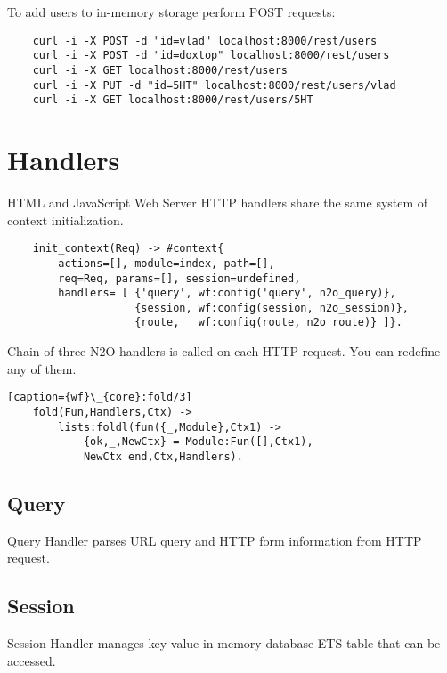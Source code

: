 To add users to in-memory storage perform POST requests:

\vspace{1\baselineskip}
\begin{lstlisting}
    curl -i -X POST -d "id=vlad" localhost:8000/rest/users
    curl -i -X POST -d "id=doxtop" localhost:8000/rest/users
    curl -i -X GET localhost:8000/rest/users
    curl -i -X PUT -d "id=5HT" localhost:8000/rest/users/vlad
    curl -i -X GET localhost:8000/rest/users/5HT
\end{lstlisting}
\vspace{1\baselineskip}

\section{Handlers}
HTML and JavaScript Web Server HTTP handlers share the same system
of context initialization. 

\vspace{1\baselineskip}
\begin{lstlisting}
    init_context(Req) -> #context{
        actions=[], module=index, path=[],
        req=Req, params=[], session=undefined,
        handlers= [ {'query', wf:config('query', n2o_query)},
                    {session, wf:config(session, n2o_session)},
                    {route,   wf:config(route, n2o_route)} ]}.
\end{lstlisting}
\vspace{1\baselineskip}

Chain of three N2O handlers is called
on each HTTP request. You can redefine any of them.

\vspace{1\baselineskip}
\begin{lstlisting}[caption={wf}\_{core}:fold/3]
    fold(Fun,Handlers,Ctx) ->
        lists:foldl(fun({_,Module},Ctx1) ->
            {ok,_,NewCtx} = Module:Fun([],Ctx1),
            NewCtx end,Ctx,Handlers).
\end{lstlisting}
\vspace{1\baselineskip}

\subsection{Query}
Query Handler parses URL query and HTTP form information from HTTP request.

\subsection{Session}
Session Handler manages key-value in-memory database ETS table that can be accessed.

